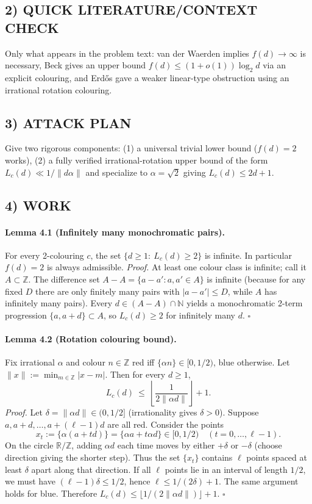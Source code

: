 \subsection*{2) QUICK LITERATURE/CONTEXT CHECK}
Only what appears in the problem text: van der Waerden implies $f(d)\to\infty$ is necessary, Beck gives an upper bound
$f(d)\le (1+o(1))\log_2 d$ via an explicit colouring, and Erd\H{o}s gave a weaker linear-type obstruction using an irrational rotation colouring.

\subsection*{3) ATTACK PLAN}
Give two rigorous components:
(1) a universal trivial lower bound ($f(d)=2$ works),
(2) a fully verified irrational-rotation upper bound of the form $L_c(d)\ll 1/\|d\alpha\|$ and specialize to $\alpha=\sqrt2$ giving $L_c(d)\le 2d+1$.

\subsection*{4) WORK}

\paragraph{Lemma 4.1 (Infinitely many monochromatic pairs).}
For every 2-colouring $c$, the set $\{d\ge 1:\ L_c(d)\ge 2\}$ is infinite. In particular $f(d)=2$ is always admissible.
\textit{Proof.}
At least one colour class is infinite; call it $A\subset\mathbb{Z}$. The difference set $A-A=\{a-a':a,a'\in A\}$ is infinite
(because for any fixed $D$ there are only finitely many pairs with $|a-a'|\le D$, while $A$ has infinitely many pairs).
Every $d\in (A-A)\cap\mathbb{N}$ yields a monochromatic 2-term progression $\{a,a+d\}\subset A$, so $L_c(d)\ge 2$ for infinitely many $d$. \hfill$\square$

\paragraph{Lemma 4.2 (Rotation colouring bound).}
Fix irrational $\alpha$ and colour $n\in\mathbb{Z}$ red iff $\{\alpha n\}\in [0,1/2)$, blue otherwise.
Let $\|x\|:=\min_{m\in\mathbb{Z}}|x-m|$. Then for every $d\ge 1$,
\[
L_c(d)\ \le\ \left\lfloor \frac{1}{2\|\alpha d\|}\right\rfloor+1.
\]
\textit{Proof.}
Let $\delta=\|\alpha d\|\in(0,1/2]$ (irrationality gives $\delta>0$).
Suppose $a,a+d,\dots,a+(\ell-1)d$ are all red. Consider the points
\[
x_t:=\{\alpha(a+td)\}=\{\alpha a+t\alpha d\}\in [0,1/2)\quad (t=0,\dots,\ell-1).
\]
On the circle $\mathbb{R}/\mathbb{Z}$, adding $\alpha d$ each time moves by either $+\delta$ or $-\delta$ (choose direction giving the shorter step).
Thus the set $\{x_t\}$ contains $\ell$ points spaced at least $\delta$ apart along that direction. If all $\ell$ points lie in an interval of length $1/2$,
we must have $(\ell-1)\delta\le 1/2$, hence $\ell\le 1/(2\delta)+1$. The same argument holds for blue.
Therefore $L_c(d)\le \lfloor 1/(2\|\alpha d\|)\rfloor+1$. \hfill$\square$

